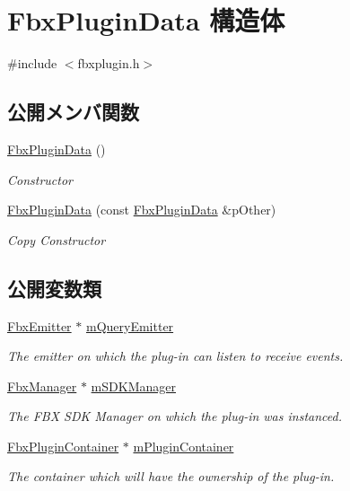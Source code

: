 \hypertarget{struct_fbx_plugin_data}{}\section{Fbx\+Plugin\+Data 構造体}
\label{struct_fbx_plugin_data}


{\ttfamily \#include $<$fbxplugin.\+h$>$}

\subsection*{公開メンバ関数}
\begin{DoxyCompactItemize}
\item 
\hyperlink{struct_fbx_plugin_data_a4fb32fb98910a0e08a042710f62cd9bd}{Fbx\+Plugin\+Data} ()
\begin{DoxyCompactList}\small\item\em Constructor \end{DoxyCompactList}\item 
\hyperlink{struct_fbx_plugin_data_a917084f1dce5a4d57fd77aeec548bead}{Fbx\+Plugin\+Data} (const \hyperlink{struct_fbx_plugin_data}{Fbx\+Plugin\+Data} \&p\+Other)
\begin{DoxyCompactList}\small\item\em Copy Constructor \end{DoxyCompactList}\end{DoxyCompactItemize}
\subsection*{公開変数類}
\begin{DoxyCompactItemize}
\item 
\hyperlink{class_fbx_emitter}{Fbx\+Emitter} $\ast$ \hyperlink{struct_fbx_plugin_data_a56d73d6518e4691e6f119b8362f1dff6}{m\+Query\+Emitter}
\begin{DoxyCompactList}\small\item\em The emitter on which the plug-\/in can listen to receive events. \end{DoxyCompactList}\item 
\hyperlink{class_fbx_manager}{Fbx\+Manager} $\ast$ \hyperlink{struct_fbx_plugin_data_abf03db73893382d5b5c7d46a3485f53d}{m\+S\+D\+K\+Manager}
\begin{DoxyCompactList}\small\item\em The F\+BX S\+DK Manager on which the plug-\/in was instanced. \end{DoxyCompactList}\item 
\hyperlink{class_fbx_plugin_container}{Fbx\+Plugin\+Container} $\ast$ \hyperlink{struct_fbx_plugin_data_aa77748ca8ef7942f31b0c29aadc8d789}{m\+Plugin\+Container}
\begin{DoxyCompactList}\small\item\em The container which will have the ownership of the plug-\/in. \end{DoxyCompactList}\end{DoxyCompactItemize}


